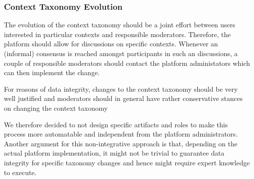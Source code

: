 \subsubsection{Context Taxonomy Evolution}
\label{ssec:Context_Taxonomy_Evolution}
The evolution of the context taxonomy should be a joint effort between users interested in particular contexts and responsible moderators.
Therefore, the platform should allow for discussions on specific contexts.
Whenever an (informal) consensus is reached amongst participants in such an discussions, a couple of responsible moderators should contact the platform administators which can then implement the change.

For reasons of data integrity, changes to the context taxonomy should be very well justified and moderators should in general have rather conservative stances on changing the context taxonomy

We therefore decided to not design specific artifacts and roles to make this process more automatable and independent from the platform administrators.
Another argument for this non-integrative approach is that, depending on the actual platform implementation, it might not be trivial to guarantee data integrity for specific taxonomy changes and hence might require expert knowledge to execute.


% 
% 
% 




